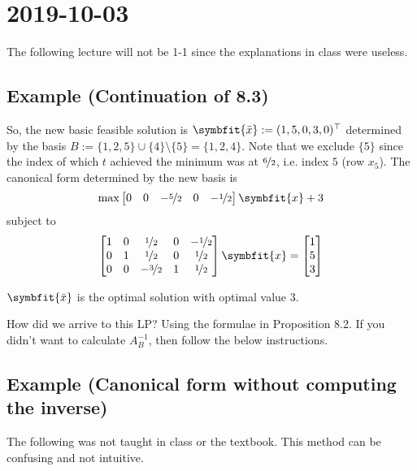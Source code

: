 \section{2019-10-03}
\begin{remark}
    The following lecture will not be 1-1 since the explanations in class were useless.
\end{remark}

\subsection{Example (Continuation of 8.3)}
So, the new basic feasible solution is $\symbfit{\bar{x}}:=(1,5,0,3,0)^\top$
determined by the basis $B:=\{1,2,5\}\cup\{4\}\setminus \{5\}=\{1,2,4\}$. Note that
we exclude $\{5\}$ since the index of which $t$ achieved the minimum was at
$\nicefrac{6}{2}$, i.e. index $5$ (row $x_5$). The canonical form determined by the new
basis is
\[\max \begin{bmatrix}
    0 & 0 & -\nicefrac{5}{2} & 0 & -\nicefrac{1}{2}
\end{bmatrix}\symbfit{x}+3\]
subject to
\[
    \begin{bmatrix}
        1 & 0 & \nicefrac{1}{2} & 0 & -\nicefrac{1}{2}\\
        0 & 1 & \nicefrac{1}{2} & 0 & \nicefrac{1}{2}\\
        0 & 0 & -\nicefrac{3}{2} & 1 & \nicefrac{1}{2}
    \end{bmatrix}\symbfit{x}
    =
    \begin{bmatrix}
        1\\
        5\\
        3
    \end{bmatrix}
\]
\begin{remark}
    $\symbfit{\bar{x}}$ is the optimal solution with optimal value $3$.
\end{remark}
\begin{remark}
    How did we arrive to this LP? Using the formulae in Proposition 8.2. If you didn't want to
    calculate $A_B^{-1}$, then follow the below instructions.
\end{remark}

\subsection{Example (Canonical form without computing the inverse)}
\begin{remark}
    The following was not taught in class or the textbook. 
    This method can be confusing and not intuitive.
\end{remark}



